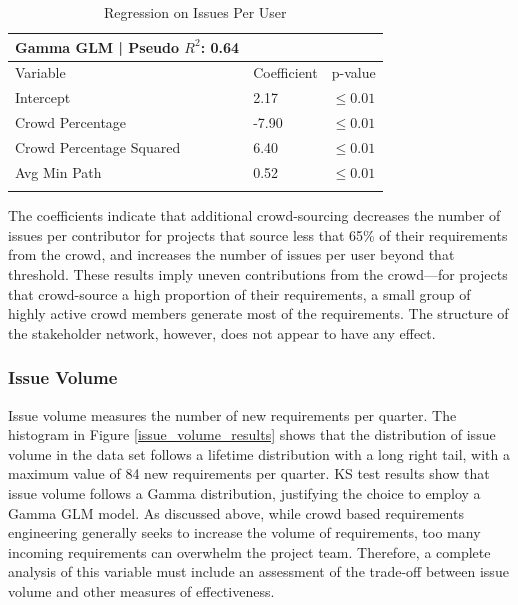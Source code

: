 \begin{table}
\caption{Regression on Issues Per User}
\label{issues_per_user_regression}
\begin{tabular}{lll}
Gamma GLM | Pseudo $R^2$: 0.64 \\
\hline\noalign{\smallskip}
Variable & Coefficient & p-value  \\
\noalign{\smallskip}\hline\noalign{\smallskip}
Intercept & 2.17 & $\leq 0.01$ \\
Crowd Percentage & -7.90 & $\leq 0.01$ \\
Crowd Percentage Squared & 6.40 & $\leq 0.01$  \\
Avg Min Path & 0.52 & $\leq 0.01$  \\
\noalign{\smallskip}\hline
\end{tabular}
\end{table}

The coefficients indicate that additional crowd-sourcing decreases the number of issues per contributor for projects that source less that 65\% of their requirements from the crowd, and increases the number of issues per user beyond that threshold. These results imply uneven contributions from the crowd---for projects that crowd-source a high proportion of their requirements, a small group of highly active crowd members generate most of the requirements. The structure of the stakeholder network, however, does not appear to have any effect.

\subsubsection{Issue Volume}

Issue volume measures the number of new requirements per quarter. The histogram in Figure \ref{issue_volume_results} shows that the distribution of issue volume in the data set follows a lifetime distribution with a long right tail, with a maximum value of 84 new requirements per quarter. KS test results show that issue volume follows a Gamma distribution, justifying the choice to employ a Gamma GLM model. As discussed above, while crowd based requirements engineering generally seeks to increase the volume of requirements, too many incoming requirements can overwhelm the project team. Therefore, a complete analysis of this variable must include an assessment of the trade-off between issue volume and other measures of effectiveness.


